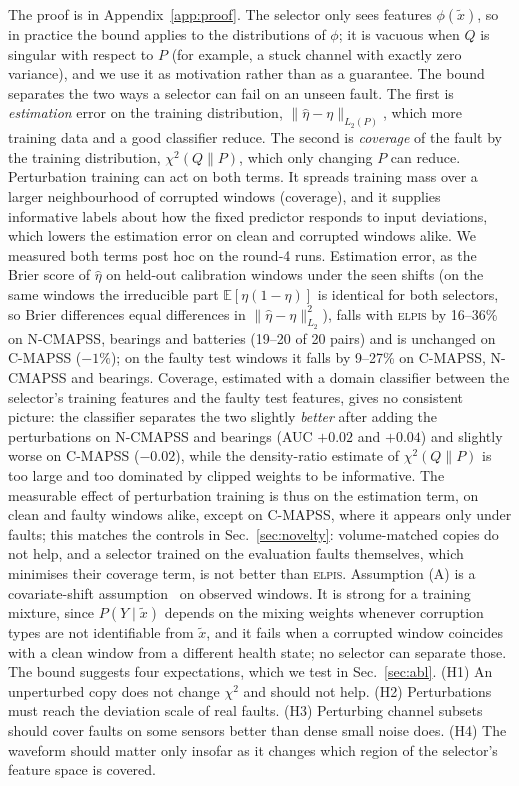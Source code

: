 \documentclass{esannV2}
\newcommand{\RPT}{\textsc{elpis}}
\begin{document}
\noindent The proof is in Appendix~\ref{app:proof}. The selector only sees features $\phi(\tilde x)$, so in practice the bound applies to the distributions of $\phi$; it is vacuous when $Q$ is singular with respect to $P$ (for example, a stuck channel with exactly zero variance), and we use it as motivation rather than as a guarantee. The bound separates the two ways a selector can fail on an unseen fault. The first is \emph{estimation} error on the training distribution, $\|\hat\eta-\eta\|_{L_2(P)}$, which more training data and a good classifier reduce. The second is \emph{coverage} of the fault by the training distribution, $\chi^2(Q\|P)$, which only changing $P$ can reduce. Perturbation training can act on both terms. It spreads training mass over a larger neighbourhood of corrupted windows (coverage), and it supplies informative labels about how the fixed predictor responds to input deviations, which lowers the estimation error on clean and corrupted windows alike. We measured both terms post hoc on the round-4 runs. Estimation error, as the Brier score of $\hat\eta$ on held-out calibration windows under the seen shifts (on the same windows the irreducible part $\mathbb E[\eta(1-\eta)]$ is identical for both selectors, so Brier differences equal differences in $\|\hat\eta-\eta\|^2_{L_2}$), falls with \RPT{} by 16--36\% on N-CMAPSS, bearings and batteries (19--20 of 20 pairs) and is unchanged on C-MAPSS ($-1\%$); on the faulty test windows it falls by 9--27\% on C-MAPSS, N-CMAPSS and bearings. Coverage, estimated with a domain classifier between the selector's training features and the faulty test features, gives no consistent picture: the classifier separates the two slightly \emph{better} after adding the perturbations on N-CMAPSS and bearings (AUC $+0.02$ and $+0.04$) and slightly worse on C-MAPSS ($-0.02$), while the density-ratio estimate of $\chi^2(Q\|P)$ is too large and too dominated by clipped weights to be informative. The measurable effect of perturbation training is thus on the estimation term, on clean and faulty windows alike, except on C-MAPSS, where it appears only under faults; this matches the controls in Sec.~\ref{sec:novelty}: volume-matched copies do not help, and a selector trained on the evaluation faults themselves, which minimises their coverage term, is not better than \RPT. Assumption (A) is a covariate-shift assumption~\cite{shimodaira2000improving} on observed windows. It is strong for a training mixture, since $P(Y\mid\tilde x)$ depends on the mixing weights whenever corruption types are not identifiable from $\tilde x$, and it fails when a corrupted window coincides with a clean window from a different health state; no selector can separate those. The bound suggests four expectations, which we test in Sec.~\ref{sec:abl}. (H1) An unperturbed copy does not change $\chi^2$ and should not help. (H2) Perturbations must reach the deviation scale of real faults. (H3) Perturbing channel subsets should cover faults on some sensors better than dense small noise does. (H4) The waveform should matter only insofar as it changes which region of the selector's feature space is covered.
\end{document}

